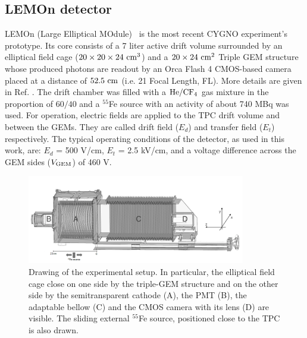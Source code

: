 \documentclass[a4paper,11pt]{article}
\begin{document}
\subsection{LEMOn detector}

LEMOn (Large Elliptical MOdule)~\cite{bib:ieee17} is the most recent CYGNO experiment's prototype. Its core consists of a 7 liter active drift volume surrounded by an elliptical field cage ($\rm 20 \times 20 \times 24~cm^3$) and a $\rm 20 \times 24~cm^2$ Triple GEM structure whose produced photons are readout by an Orca Flash 4 CMOS-based camera~\cite{ORCAcamera} placed at a distance of $\rm 52.5~cm$ (i.e. 21 Focal Length, FL). 
More details are given in Ref. \cite{bib:fe55, bib:eps}.
The drift chamber was filled with a $\rm He/CF_4$ gas mixture in the proportion of $60/40$
and a $^{55}$Fe source with an activity of about 740 MBq was used.
For operation, electric fields are applied to the TPC drift volume and between the GEMs. They are called drift field ($E_d$) and transfer field ($E_t$) respectively.
The typical operating conditions of the detector, as used in this work, are: $E_d$ = 500 V/cm, $E_t$ = 2.5 kV/cm, and a voltage difference across the GEM sides ($ V\rm_{GEM}$) of 460 V.


\begin{figure}[ht]
\centering
\includegraphics[width=0.85\textwidth]{sex_bw3.png}
\caption{Drawing of the experimental setup. In particular, the elliptical field cage close on one side by the triple-GEM structure and on the other side by the semitransparent cathode (A), the PMT (B), the adaptable bellow (C) and the CMOS camera with its lens (D) are visible. The sliding external $^{55}$Fe source, positioned close to the TPC is also drawn.} \label{fig_lemon_1}
\end{figure}
\end{document}
